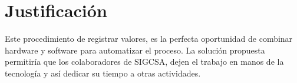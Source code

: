 \section{Justificación}

\par 
Este procedimiento de registrar valores, es la perfecta oportunidad de combinar hardware y software para automatizar el proceso. La solución propuesta permitiría que los colaboradores de SIGCSA, dejen el trabajo en manos de la tecnología y así dedicar su tiempo a otras actividades.
